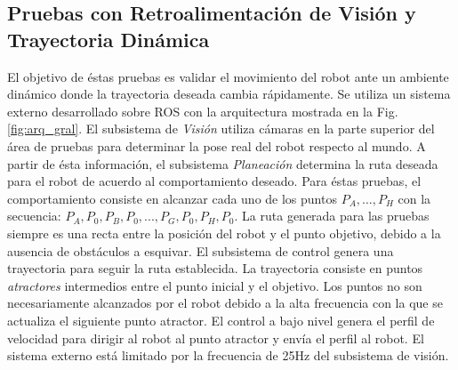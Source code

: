 \subsection{Pruebas con Retroalimentación de Visión y Trayectoria Dinámica}
El objetivo de éstas pruebas es validar el movimiento del robot ante un ambiente dinámico donde la trayectoria deseada cambia rápidamente. Se utiliza un sistema externo desarrollado sobre \gls{ROS} con la arquitectura mostrada en la Fig. \ref{fig:arq_gral}.  El subsistema de \textit{Visión} utiliza cámaras en la parte superior del área de pruebas para determinar la pose real del robot respecto al mundo. A partir de ésta información, el subsistema \textit{Planeación} determina la ruta deseada para el robot de acuerdo al comportamiento deseado. Para éstas pruebas, el comportamiento consiste en alcanzar cada uno de los puntos $P_A, ..., P_H$ con la secuencia: $P_A, P_0, P_B, P_0, ..., P_G, P_0, P_H, P_0$. La ruta generada para las pruebas siempre es una recta entre la posición del robot y el punto objetivo, debido a la ausencia de obstáculos a esquivar. El subsistema de control genera una trayectoria para seguir la ruta establecida. La trayectoria consiste en puntos \textit{atractores} intermedios entre el punto inicial y el objetivo. Los puntos no son necesariamente alcanzados por el robot debido a la alta frecuencia con la que se actualiza el siguiente punto atractor. El control a bajo nivel genera el perfil de velocidad para dirigir al robot al punto atractor y envía el perfil al robot. El sistema externo está limitado por la frecuencia de 25Hz del subsistema de visión.



